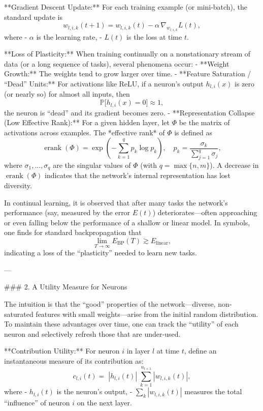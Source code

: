 **Gradient Descent Update:**  
For each training example (or mini‐batch), the standard update is
$$
w_{l,i,k}(t+1) = w_{l,i,k}(t) - \alpha\, \nabla_{w_{l,i,k}} L(t),
$$
where
- $\alpha$ is the learning rate,
- $L(t)$ is the loss at time $t$.

**Loss of Plasticity:**  
When training continually on a nonstationary stream of data (or a long sequence of tasks), several phenomena occur:
- **Weight Growth:** The weights tend to grow larger over time.
- **Feature Saturation / “Dead” Units:** For activations like ReLU, if a neuron’s output $h_{l,i}(x)$ is zero (or nearly so) for almost all inputs, then
  $$
  \mathbb{P}\bigl[h_{l,i}(x)=0\bigr] \approx 1,
  $$
  the neuron is “dead” and its gradient becomes zero.
- **Representation Collapse (Low Effective Rank):**  
  For a given hidden layer, let $\Phi$ be the matrix of activations across examples. The *effective rank* of $\Phi$ is defined as
  $$
  \operatorname{erank}(\Phi) = \exp\left(-\sum_{k=1}^{q} p_k \log p_k\right),\quad p_k = \frac{\sigma_k}{\sum_{j=1}^{q}\sigma_j},
  $$
  where $\sigma_1,\dots,\sigma_q$ are the singular values of $\Phi$ (with $q = \max\{n, m\}$). A decrease in $\operatorname{erank}(\Phi)$ indicates that the network’s internal representation has lost diversity.

In continual learning, it is observed that after many tasks the network’s performance (say, measured by the error $E(t)$) deteriorates—often approaching or even falling below the performance of a shallow or linear model. In symbols, one finds for standard backpropagation that
$$
\lim_{T\to\infty} E_{\text{BP}}(T) \gtrsim E_{\text{linear}},
$$
indicating a loss of the “plasticity” needed to learn new tasks.

---

### 2. A Utility Measure for Neurons

The intuition is that the “good” properties of the network—diverse, non‐saturated features with small weights—arise from the initial random distribution. To maintain these advantages over time, one can track the “utility” of each neuron and selectively refresh those that are under‐used.

**Contribution Utility:**  
For neuron $i$ in layer $l$ at time $t$, define an instantaneous measure of its contribution as:
$$
c_{l,i}(t) = \; |h_{l,i}(t)| \; \sum_{k=1}^{n_{l+1}} |w_{l,i,k}(t)|,
$$
where
- $h_{l,i}(t)$ is the neuron's output,
- $\sum_{k}|w_{l,i,k}(t)|$ measures the total “influence” of neuron $i$ on the next layer.

